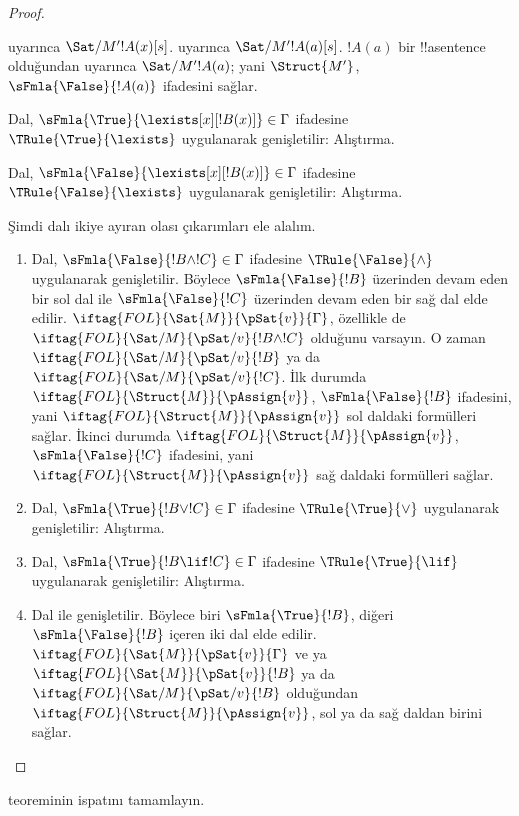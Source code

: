 \documentclass[../../../include/open-logic-section]{subfiles}
\begin{document}
\begin{proof}
\begin{enumerate}
{   uyarınca
  $\Sat/{M'}{!A(x)}[s]$.  uyarınca
  $\Sat/{M'}{!A(a)}[s]$. $!A(a)$ bir !!a{sentence} olduğundan
   uyarınca
  $\Sat/{M'}{!A(a)}$; yani $\Struct{M'}$,
  $\sFmla{\False}{!A(a)}$ ifadesini sağlar.
\item Dal, $\sFmla{\True}{\lexists[x][!B(x)]} \in \Gamma$ ifadesine
  $\TRule{\True}{\lexists}$ uygulanarak genişletilir: Alıştırma.
\item Dal, $\sFmla{\False}{\lexists[x][!B(x)]} \in \Gamma$ ifadesine
  $\TRule{\False}{\lexists}$ uygulanarak genişletilir: Alıştırma.}{}
\end{enumerate}
Şimdi dalı ikiye ayıran olası çıkarımları ele alalım.
\begin{enumerate}
\item Dal, $\sFmla{\False}{!B \land !C} \in \Gamma$ ifadesine
  $\TRule{\False}{\land}$ uygulanarak genişletilir. Böylece
  $\sFmla{\False}{!B}$ üzerinden devam eden bir sol dal ile
  $\sFmla{\False}{!C}$ üzerinden devam eden bir sağ dal elde edilir.
  $\iftag{FOL}{\Sat{M}}{\pSat{v}}{\Gamma}$, özellikle de
  $\iftag{FOL}{\Sat/{M}}{\pSat/{v}}{!B \land !C}$ olduğunu varsayın. O zaman
  $\iftag{FOL}{\Sat/{M}}{\pSat/{v}}{!B}$ ya da
  $\iftag{FOL}{\Sat/{M}}{\pSat/{v}}{!C}$. İlk durumda
  $\iftag{FOL}{\Struct{M}}{\pAssign{v}}$, $\sFmla{\False}{!B}$ ifadesini,
  yani $\iftag{FOL}{\Struct{M}}{\pAssign{v}}$ sol daldaki formülleri sağlar.
  İkinci durumda $\iftag{FOL}{\Struct{M}}{\pAssign{v}}$,
  $\sFmla{\False}{!C}$ ifadesini, yani
  $\iftag{FOL}{\Struct{M}}{\pAssign{v}}$ sağ daldaki formülleri sağlar.
\item Dal, $\sFmla{\True}{!B \lor !C} \in \Gamma$ ifadesine
  $\TRule{\True}{\lor}$ uygulanarak genişletilir: Alıştırma.
\item Dal, $\sFmla{\True}{!B \lif !C} \in \Gamma$ ifadesine
  $\TRule{\True}{\lif}$ uygulanarak genişletilir: Alıştırma.
\item Dal \Cut{} ile genişletilir. Böylece biri $\sFmla{\True}{!B}$,
  diğeri $\sFmla{\False}{!B}$ içeren iki dal elde edilir.
  $\iftag{FOL}{\Sat{M}}{\pSat{v}}{\Gamma}$ ve ya
  $\iftag{FOL}{\Sat{M}}{\pSat{v}}{!B}$ ya da
  $\iftag{FOL}{\Sat/{M}}{\pSat/{v}}{!B}$ olduğundan
  $\iftag{FOL}{\Struct{M}}{\pAssign{v}}$, sol ya da sağ daldan birini
  sağlar.
\end{enumerate}
\end{proof}

\begin{prob}
 teoreminin ispatını tamamlayın.
\end{prob}
\tagendprob
\end{document}
